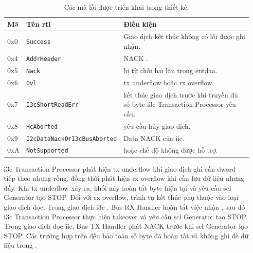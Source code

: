 \begin{table}[!htbp]
	\centering
	\caption{Các mã lỗi được triển khai trong thiết kế.}
	\label{tab:err-status}
	\begin{tabular}{C{1.5cm} L{4.0cm} L{7.5cm}}
		\toprule
		\textbf{Mã} & \textbf{Tên \gls{rtl}}                          & \textbf{Điều kiện}                                                                                \\
		\midrule
		0x0         & \texttt{Success}                                & Giao dịch kết thúc không có lỗi được ghi nhận.                                                    \\
		0x4         & \texttt{AddrHeader}                             & \Target{} NACK \AddressHeader{}.                                                                  \\
		0x5         & \texttt{Nack}                                   & \DynamicAddress{} bị \Target{} từ chối hai lần trong \gls{entdaa}.                                \\
		0x6         & \texttt{Ovl}                                    & \gls{tx} underflow hoặc \gls{rx} overflow.                                                        \\
		0x7         & \texttt{I3cShortReadErr}                        & \Target{} kết thúc giao dịch trước khi truyền đủ số byte \gls{i3c} Transaction Processor yêu cầu. \\
		0x8         & \texttt{HcAborted}                              & \Host{} yêu cầu hủy giao dịch.                                                                    \\
		0x9         & \texttt{I2cDataNackOr\allowbreak I3cBusAborted} & Data NACK của \gls{iic}.                                                                          \\
		0xA         & \texttt{NotSupported}                           & \CommandDescriptor{} hoặc chế độ không được hỗ trợ.                                               \\
		\bottomrule
	\end{tabular}
\end{table}

\gls{i3c} Transaction Processor phát hiện \gls{tx} underflow khi giao dịch ghi cần \gls{dword} tiếp theo
nhưng \TxFifo{} rỗng, đồng thời phát hiện \gls{rx} overflow khi cần lưu dữ liệu nhưng \RxFifo{} đầy.
Khi \gls{tx} underflow xảy ra, khối này hoàn tất byte hiện tại và yêu cầu \gls{scl} Generator tạo STOP. Đối với \gls{rx}
overflow, trình tự kết thúc phụ thuộc vào loại giao dịch đọc. Trong giao dịch \gls{i3c} \PrivateRead{},
Bus RX Handler hoàn tất việc nhận \TBit{}, sau đó \gls{i3c} Transaction Processor thực hiện
takeover và yêu cầu \gls{scl} Generator tạo STOP. Trong giao dịch đọc \gls{iic}, Bus TX Handler phát
NACK trước khi \gls{scl} Generator tạo STOP. Các trường hợp trên đều bảo toàn số byte đã hoàn tất và
không ghi đè dữ liệu trong \RxFifo{}.

